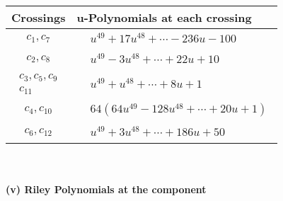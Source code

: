 \documentclass[1p]{elsarticle_modified}
\theoremstyle{definition}
\begin{document}
\begin{tabular}{m{50pt}|m{274pt}}
Crossings & \hspace{64pt}u-Polynomials at each crossing \\
\hline $$\begin{aligned}c_{1},c_{7}\end{aligned}$$&$\begin{aligned}
&u^{49}+17 u^{48}+\cdots-236 u-100
\end{aligned}$\\
\hline $$\begin{aligned}c_{2},c_{8}\end{aligned}$$&$\begin{aligned}
&u^{49}-3 u^{48}+\cdots+22 u+10
\end{aligned}$\\
\hline $$\begin{aligned}c_{3},c_{5},c_{9}\\c_{11}\end{aligned}$$&$\begin{aligned}
&u^{49}+u^{48}+\cdots+8 u+1
\end{aligned}$\\
\hline $$\begin{aligned}c_{4},c_{10}\end{aligned}$$&$\begin{aligned}
&64(64 u^{49}-128 u^{48}+\cdots+20 u+1)
\end{aligned}$\\
\hline $$\begin{aligned}c_{6},c_{12}\end{aligned}$$&$\begin{aligned}
&u^{49}+3 u^{48}+\cdots+186 u+50
\end{aligned}$\\
\hline
\end{tabular}\\~\\
\newpage\renewcommand{\arraystretch}{1}
\flushleft \textbf{(v) Riley Polynomials at the component}\newline \\
\end{document}
